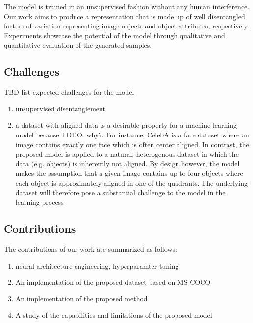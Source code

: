 \documentclass[11pt,a4paper]{article}
\begin{document}
The model is trained in an unsupervised fashion without any human interference. Our work aims to produce a representation that is made up of well disentangled factors of variation representing image objects and object attributes, respectively. Experiments showcase the potential of the model through qualitative and quantitative evaluation of the generated samples.

\subsection{Challenges}
TBD list expected challenges for the model
\begin{enumerate}
  \item unsupervised disentanglement
  \item a dataset with aligned data is a desirable property for a machine learning model because TODO: why?. For instance, CelebA is a face dataset where an image contains exactly one face which is often center aligned. In contrast, the proposed model is applied to a natural, heterogenous dataset in which the data (e.g. objects) is inherently not aligned. By design however, the model makes the assumption that a given image contains up to four objects where each object is approximately aligned in one of the quadrants. The underlying dataset will therefore pose a substantial challenge to the model in the learning process
\end{enumerate}

\subsection{Contributions}
The contributions of our work are summarized as follows:
\begin{enumerate}
  \item neural architecture engineering, hyperparamter tuning
  \item An implementation of the proposed dataset based on MS COCO
  \item An implementation of the proposed method
  \item A study of the capabilities and limitations of the proposed model
\end{enumerate}
\end{document}
